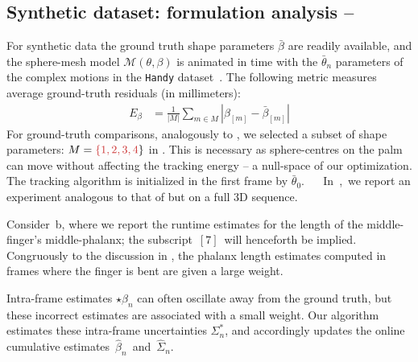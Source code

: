 \subsection{Synthetic dataset: formulation analysis -- }
\label{sec:analysis}
For synthetic data the ground truth shape parameters $\bar\beta$ are readily available, and the sphere-mesh model $\mathcal{M}(\theta,\beta)$ is animated in time with the $\bar\theta_n$ parameters of the complex motions in the \texttt{Handy} dataset~\cite{tkach2016sphere}. The following metric measures average ground-truth residuals (in millimeters):
% 
\begin{align}
E_{\beta} &= \tfrac{1}{|M|} \sum_{m \in M} \left| \beta_{[m]} - \bar\beta_{[m]} \right|
\label{eq:metricgt}
\end{align}
% 
For ground-truth comparisons, analogously to \cite{taylor2016joint}, we selected a subset of shape parameters: $M=\todo{\{1,2,3,4}\}$ in . This is necessary as sphere-centres on the palm can move without affecting the tracking energy -- a null-space of our optimization. The tracking algorithm is initialized in the first frame by $\bar\theta_0$.
%
$\quad$
% 
In~,~we report an experiment analogous to that of  but on a full 3D sequence.
\begin{edit}
Consider~b, where we report the runtime estimates for the length of the middle-finger's middle-phalanx; the subscript~{$[7]$}~will henceforth be implied.
Congruously to the discussion in , the phalanx length
estimates computed in frames where the finger is bent are given a large weight.
\end{edit}
Intra-frame estimates {\small $\star\beta_n$} can often oscillate away from the ground truth, but these incorrect estimates are associated with a small weight.
% 
Our algorithm estimates these intra-frame uncertainties {\small $\Sigma^*_n$}, and accordingly updates the online cumulative estimates~{\small $\hat\beta_n$}~and~{\small $\hat\Sigma_n$}.



